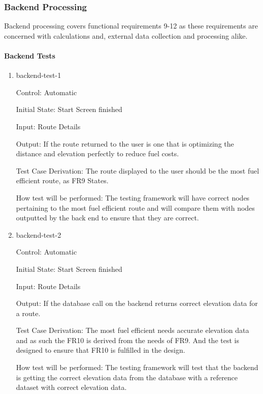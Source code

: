 \documentclass[12pt, titlepage]{article}
\begin{document}
\subsubsection{Backend Processing} \label{BE}

Backend processing covers functional requirements 9-12 as these 
requirements are concerned with calculations and, external data collection and processing 
alike.
		
\paragraph{Backend Tests}

\begin{enumerate}

\item{backend-test-1\\}

Control: Automatic
					
Initial State: Start Screen finished
					
Input: Route Details
					
Output: If the route returned to the user is one that is optimizing the distance and elevation perfectly to reduce fuel costs.

Test Case Derivation: The route displayed to the user should be the most fuel efficient route, as FR9 States.
					
How test will be performed: The testing framework will have correct nodes pertaining to the most fuel efficient route and will 
compare them with nodes outputted by the back end to ensure that they are correct.
					
\item{backend-test-2\\}

Control: Automatic
					
Initial State: Start Screen finished
					
Input: Route Details
					
Output: If the database call on the backend returns correct elevation data for a route.

Test Case Derivation: The most fuel efficient needs accurate elevation data and as such the FR10 is derived from the needs of FR9. And 
the test is designed to ensure that FR10 is fulfilled in the design.
					
How test will be performed: The testing framework will test that the backend is getting the correct elevation data from the database 
with a reference dataset with correct elevation data.
					

\end{enumerate}
\end{document}
